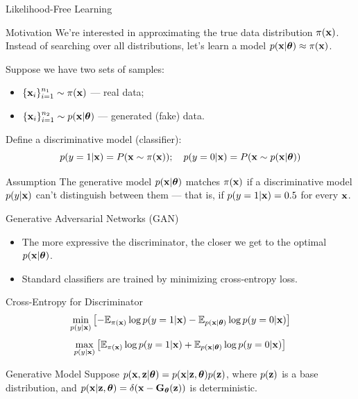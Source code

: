 \documentclass{beamer}
\begin{document}
\begin{frame}{Likelihood-Free Learning}
	\begin{block}{Motivation}
	 We're interested in approximating the true data distribution $\pi(\mathbf{x})$.
	Instead of searching over all distributions, let's learn a model $p(\mathbf{x} | \boldsymbol{\theta}) \approx \pi(\mathbf{x})$.
	\end{block}
	\eqpause
	Suppose we have two sets of samples: 
	\begin{itemize}
		\item $\{\mathbf{x}_i\}_{i=1}^{n_1} \sim \pi(\mathbf{x})$ — real data;
		\item $\{\mathbf{x}_i\}_{i=1}^{n_2} \sim p(\mathbf{x} | \boldsymbol{\theta})$ — generated (fake) data.
	\end{itemize}
	\eqpause
	Define a discriminative model (classifier):
	\[
		p(y = 1 | \mathbf{x}) = P(\mathbf{x} \sim \pi(\mathbf{x})); \quad p(y = 0 | \mathbf{x}) = P(\mathbf{x} \sim p(\mathbf{x} | \boldsymbol{\theta}))
	\]
	\eqpause
	\vspace{-0.5cm}
	\begin{block}{Assumption}
		The generative model $p(\mathbf{x} | \boldsymbol{\theta})$ matches $\pi(\mathbf{x})$ if a discriminative model $p(y | \mathbf{x})$ can't distinguish between them --- that is, if $p(y = 1 | \mathbf{x}) = 0.5$ for every $\mathbf{x}$.
	\end{block}
\end{frame}
\begin{frame}{Generative Adversarial Networks (GAN)}
	\begin{itemize}
		\item The more expressive the discriminator, the closer we get to the optimal $p(\mathbf{x} | \boldsymbol{\theta})$.
		\item Standard classifiers are trained by minimizing cross-entropy loss.
	\end{itemize}
	\eqpause
	\begin{block}{Cross-Entropy for Discriminator}
		\vspace{-0.3cm}
		\[
			\min_{p(y | \mathbf{x})} \left[ - \mathbb{E}_{\pi(\mathbf{x})} \log p(y = 1 | \mathbf{x}) - \mathbb{E}_{p(\mathbf{x} | \boldsymbol{\theta})} \log p(y = 0 | \mathbf{x}) \right] 
		\]
		\[
			\max_{p(y | \mathbf{x})} \left[\mathbb{E}_{\pi(\mathbf{x})} \log p(y = 1 | \mathbf{x}) + \mathbb{E}_{p(\mathbf{x} | \boldsymbol{\theta})} \log p(y = 0 | \mathbf{x}) \right] 
		\]
	\end{block}
	\eqpause
	\vspace{-0.3cm}
	\begin{block}{Generative Model}
		Suppose $p(\mathbf{x}, \mathbf{z} | \boldsymbol{\theta}) = p (\mathbf{x} | \mathbf{z}, \boldsymbol{\theta}) p(\mathbf{z})$, where $p(\mathbf{z})$ is a base distribution, and $p(\mathbf{x} | \mathbf{z}, \boldsymbol{\theta}) = \delta (\mathbf{x} - \mathbf{G}_{\boldsymbol{\theta}}(\mathbf{z}))$ is deterministic.
	\end{block}
\end{frame}
\end{document}
